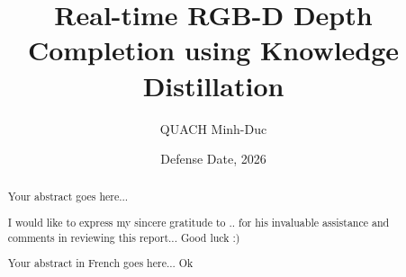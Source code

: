 \documentclass[12pt, a4paper]{memoir} %
\title{Real-time RGB-D Depth Completion using Knowledge Distillation} %
\author{QUACH Minh-Duc}
\date{Defense Date, 2026} %
\begin{document}
\frontmatter
\begin{titlingpage}
\maketitle
\end{titlingpage}

\setlength{\parskip}{-1pt plus 1pt}

\renewcommand{\abstracttextfont}{\normalfont}
\abstractintoc
\begin{abstract} 
Your abstract goes here... 
\end{abstract}
\abstractintoc

\renewcommand\abstractname{Acknowledgement}
\begin{abstract}
I would like to express my sincere gratitude to .. for his invaluable assistance and comments in reviewing this report... 
Good luck :) 
\end{abstract}


\renewcommand\abstractname{R\'esum\'e}
\begin{abstract} 
Your abstract in French goes here... Ok
\end{abstract}

\cleardoublepage

\tableofcontents* %
\normalsize

\mainmatter
\SingleSpace









\backmatter



\end{document}
